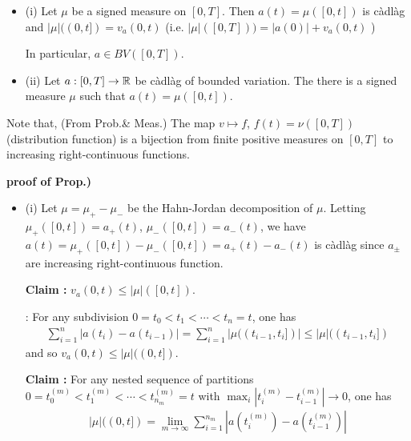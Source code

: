 \documentclass[12pt,a4paper]{article}
\newenvironment{proof}
{\begin{changemargin}{0.5cm}{0.5cm} 
	}%
	{\end{changemargin}
}
\newenvironment{subproof}
{\begin{changemargin}{0.5cm}{0.5cm} 
	}%
	{\end{changemargin}
}
\renewenvironment{i}
{\begin{itemize} 
	}%
	{\end{itemize}
}
\newenvironment{p}
{\begin{proof} 
	}%
	{\end{proof}
}
\begin{document}
\prop \begin{i}
\item[(i)] Let $\mu$ be a signed measure on $[0, T]$. Then $a(t) = \mu ([0,t])$ is c\`adl\`ag and $|\mu|((0,t]) = v_a(0,t)$ (i.e. $|\mu|([0,T])) = |a(0)| + v_a(0,t)$ )

\quad In particular, $a\in BV([0,T])$.
\item[(ii)] Let $a: [0, T] \rightarrow \mathbb{R}$ be c\`adl\`ag of bounded variation. The there is a signed measure $\mu$ such that $a(t) = \mu([0,t])$.
\end{i}
Note that,
\fact (From Prob.\& Meas.) The map $v\mapsto f$, $f(t) = \nu ([0,T])$ (distribution function) is a bijection from finite positive measures on $[0,T]$ to increasing right-continuous functions.
\begin{p}
\textbf{proof of Prop.)} 
\begin{i}
\item[(i)] Let $\mu = \mu_+ - \mu_-$ be the Hahn-Jordan decomposition of $\mu$. Letting $\mu_+ ([0,t])= a_+(t)$, $\mu_-([0,t]) = a_-(t)$, we have $a(t) = \mu_+([0, t]) - \mu_-([0,t]) = a_+(t) - a_-(t)$ is c\`adl\`ag since $a_{\pm}$ are increasing right-continuous function.

\textbf{Claim :} $v_a(0,t) \leq |\mu|([0,t])$.
\begin{subproof}
: For any subdivision $0 = t_0 < t_1<\cdots < t_n =t$, one has
\begin{align*}
\sum_{i=1}^n |a(t_i) - a(t_{i-1})|  = \sum_{i=1}^n |\mu((t_{i-1}, t_i])| \leq |\mu|((t_{i-1}, t_i])
\end{align*}
and so $v_a(0,t) \leq |\mu|((0,t])$.
\end{subproof}

\textbf{Claim :} For any nested sequence of partitions $0 = t_0^{(m)} < t_1^{(m)} < \cdots < t_{n_m}^{(m)} =t$ with $\max_i |t_i^{(m)} - t_{i-1}^{(m)}| \rightarrow 0$, one has
\begin{align*}
|\mu|((0,t]) = \lim_{m\rightarrow \infty} \sum_{i=1}^{n_m} |a(t_i^{(m)}) - a(t_{i-1}^{(m)})|
\end{align*}


\end{i}
\end{p}
\end{document}

